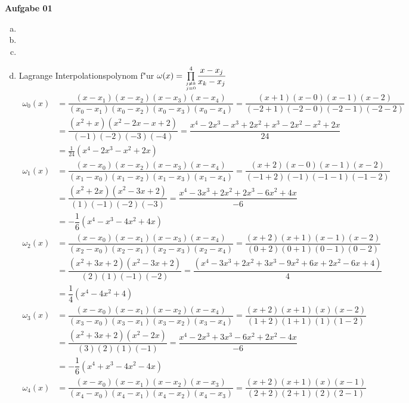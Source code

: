 \documentclass[a4paper,10pt]{article}
\begin{document}
	\parindent0pt
	\textbf{Aufgabe 01}\\
	\begin{enumerate}[a)]
		\item 
		\item 
		\item 
		\newpage
		\item Lagrange Interpolationspolynom f"ur $\omega(x) = \underset{j \neq k \atop j = 0}{\overset{4}{\prod}}  \dfrac{x - x_j}{x_k - x_j}$\\
		\begin{align*}
			\omega_0(x) & = \dfrac{(x - x_1)(x - x_2)(x - x_3)(x - x_4)}{(x_0 - x_1)(x_0 - x_2)(x_0 - x_3)(x_0 - x_4)} = \dfrac{(x + 1)(x - 0)(x - 1)(x - 2)}{(-2 + 1)(-2 -0)(-2 -1)(-2 -2)}\\
			& = \dfrac{(x^2 + x)(x^2 - 2x - x + 2)}{(-1)(-2)(-3)(-4)} = \dfrac{x^4 - 2x^3 -x^3 + 2x^2 +x^3 -2x^2 -x^2 + 2x}{24}\\
			& = \frac{1}{24}(x^4 - 2x^3 -x^2 + 2x)\\
			\omega_1(x) & = \dfrac{(x - x_0)(x - x_2)(x - x_3)(x - x_4)}{(x_1 - x_0)(x_1 - x_2)(x_1 - x_3)(x_1 - x_4)} = \dfrac{(x + 2)(x - 0)(x - 1)(x - 2)}{(-1 + 2)(-1)(-1 - 1)(-1 - 2)}\\
			& = \dfrac{(x^2 + 2x)(x^2 - 3x + 2)}{(1)(-1)(-2)(-3)} = \dfrac{x^4 - 3x^3 + 2x^2 + 2x^3 - 6x^2 + 4x}{-6}\\
			& = -\dfrac{1}{6}(x^4 - x^3 -4x^2 + 4x)\\
			\omega_2(x) & = \dfrac{(x - x_0)(x - x_1)(x - x_3)(x - x_4)}{(x_2 - x_0)(x_2 - x_1)(x_2 - x_3)(x_2 - x_4)} = \dfrac{(x + 2)(x + 1)(x - 1)(x - 2)}{(0 + 2)(0 + 1)(0 - 1)(0 - 2)}\\
			& = \dfrac{(x^2 + 3x + 2)(x^2 - 3x + 2)}{(2)(1)(-1)(-2)} = \dfrac{(x^4 - 3x^3 + 2x^2 + 3x^3 - 9x^2 + 6x + 2x^2 - 6x + 4)}{4}\\
			& = \dfrac{1}{4}(x^4 - 4x^2 + 4)\\
			\omega_3(x) & = \dfrac{(x - x_0)(x - x_1)(x - x_2)(x - x_4)}{(x_3 - x_0)(x_3 - x_1)(x_3 - x_2)(x_3 - x_4)} = \dfrac{(x + 2)(x + 1)(x)(x - 2)}{(1 + 2)(1 + 1)(1)(1 - 2)}\\
			& = \dfrac{(x^2 + 3x + 2)(x^2 - 2x)}{(3)(2)(1)(-1)} = \dfrac{x^4 - 2x^3 + 3x^3 -6x^2 + 2x^2 - 4x}{-6}\\
			& = -\dfrac{1}{6}(x^4 + x^3 - 4x^2 -4x)\\
			\omega_4(x) & = \dfrac{(x - x_0)(x - x_1)(x - x_2)(x - x_3)}{(x_4 - x_0)(x_4 - x_1)(x_4 - x_2)(x_4 - x_3)} = \dfrac{(x + 2)(x + 1)(x)(x - 1)}{(2 + 2)(2 + 1)(2)(2 - 1)}\\

\end{align*}
\end{enumerate}
\end{document}
